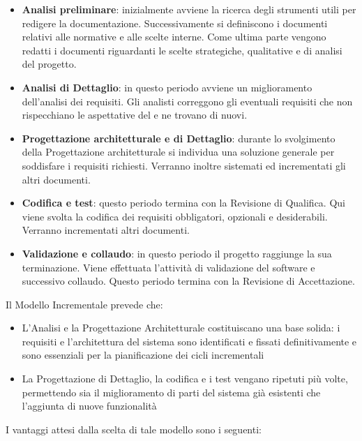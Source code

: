 \begin{itemize}
	\item \textbf{Analisi preliminare}: inizialmente avviene la ricerca degli strumenti utili per redigere la documentazione. Successivamente si definiscono i documenti relativi alle normative e alle scelte interne. Come ultima parte vengono redatti i documenti riguardanti le scelte strategiche, qualitative e di analisi del progetto.
	\item \textbf{Analisi di Dettaglio}: in questo periodo avviene un miglioramento dell'analisi dei requisiti. Gli analisti correggono gli eventuali requisiti che non rispecchiano le aspettative del  e ne trovano di nuovi.
	\item \textbf{Progettazione architetturale e di Dettaglio}: durante lo svolgimento della Progettazione architetturale si individua una soluzione generale per soddisfare i requisiti richiesti. Verranno inoltre sistemati ed incrementati gli altri documenti.
	\item \textbf{Codifica e test}: questo periodo termina con la Revisione di Qualifica. Qui viene svolta la codifica dei requisiti obbligatori, opzionali e desiderabili. Verranno incrementati altri documenti. 
	\item \textbf{Validazione e collaudo}: in questo periodo il progetto raggiunge la sua terminazione. Viene effettuata l'attività di validazione del software e successivo collaudo. Questo periodo termina con la Revisione  di Accettazione. 
\end{itemize}

Il Modello Incrementale prevede che:
\begin{itemize}
\item L’Analisi e la Progettazione Architetturale costituiscano una base solida: i requisiti e l’architettura del sistema sono identificati e fissati definitivamente e sono essenziali per la pianificazione dei cicli incrementali
\item La Progettazione di Dettaglio, la codifica e i test vengano ripetuti più volte, permettendo sia il miglioramento di parti del sistema già esistenti che l’aggiunta di nuove funzionalità
\end{itemize}

I vantaggi attesi dalla scelta di tale modello sono i seguenti:

